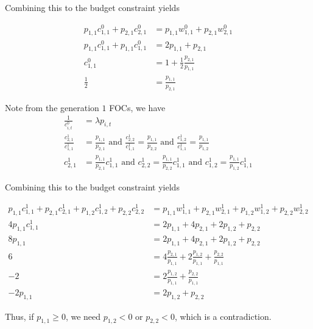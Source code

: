 \documentclass[12pt]{article}
\theoremstyle{definition}
\begin{document}
\begin{enumerate}[(1)]
Combining this to the budget constraint yields

\begin{align*}
	p_{1,1}c_{1,1}^0	+ p_{2,1}c_{2,1}^0 & = p_{1,1}w_{1,1}^0 +p_{2,1}w_{2,1}^0 \\
	p_{1,1}c_{1,1}^0	+{p_{1,1}}c_{1,1}^0 & = 2p_{1,1} +p_{2,1} \\	
	c_{1,1}^0 & =  1 + \frac{1}{2}\frac{p_{2,1}}{p_{1,1}} \\
	\frac{1}{2}& = \frac{p_{1,1}}{p_{2,1}}
\end{align*}

Note from the generation $1$ FOCs, we have
\begin{align*}
\frac{1}{c_{i,t}^0} &= \lambda p_{i,t}\\
\frac{c_{2,1}^1}{c_{1,1}^1} &= \frac{p_{1,1}}{p_{2,1}} \text{ and } \frac{c_{2,2}^1}{c_{1,1}^1} = \frac{p_{1,1}}{p_{2,2}}   \text{ and } \frac{c_{1,2}^1}{c_{1,1}^1} = \frac{p_{1,1}}{p_{1,2}} \\
c_{2,1}^1&= \frac{p_{1,1}}{p_{2,1}}c_{1,1}^1 \text{ and } c_{2,2}^1= \frac{p_{1,1}}{p_{2,2}}c_{1,1}^1\text{ and } c_{1,2}^1= \frac{p_{1,1}}{p_{1,2}}c_{1,1}^1
\end{align*}

Combining this to the budget constraint yields

\begin{align*}
p_{1,1}c_{1,1}^1	+ p_{2,1}c_{2,1}^1  + p_{1,2}c_{1,2}^1	+ p_{2,2}c_{2,2}^1 & = p_{1,1}w_{1,1}^1	+ p_{2,1}w_{2,1}^1  + p_{1,2}w_{1,2}^1	+ p_{2,2}w_{2,2}^1 \\
4p_{1,1}c_{1,1}^1& = 2p_{1,1}	+ 4p_{2,1}  + 2p_{1,2}	+ p_{2,2} \\
8p_{1,1}& =  2p_{1,1}	+ 4p_{2,1}  + 2p_{1,2}	+ p_{2,2} \\
6& =   4\frac{p_{2,1}}{p_{1,1}}  + 2\frac{p_{1,2}}{p_{1,1}}	+ \frac{p_{2,2}}{p_{1,1}} \\
-2& =  2\frac{p_{1,2}}{p_{1,1}}	+ \frac{p_{2,2}}{p_{1,1}}\\
-2p_{1,1}& =  2p_{1,2}	+ p_{2,2}
\end{align*}

Thus, if $p_{1,1}\geq 0$, we need $p_{1,2}<0$ or $p_{2,2}<0$, which is a contradiction.

\end{enumerate}
\end{document}
